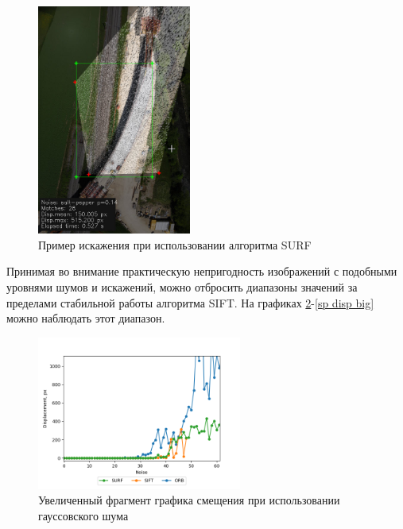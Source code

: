 {{{	\begin{figure}[H]
		\centering                             
		\includegraphics[width=0.45\textwidth,keepaspectratio]{fails/result.jpg}      
		\centering\caption{Пример искажения при использовании алгоритма SURF}
		\label{fail surf}    
	\end{figure} 

	Принимая во внимание практическую непригодность изображений с подобными уровнями шумов и искажений, можно отбросить диапазоны значений за пределами стабильной работы алгоритма SIFT. На графиках \ref{gauss disp big}-\ref{sp disp big} можно наблюдать этот диапазон. 
	
	\begin{figure}[H]
		\centering                             
		\includegraphics[width=0.60\textwidth,keepaspectratio]{ex2/gauss/Rand_noises_displacement_big.png}   
		\centering\caption{ Увеличенный фрагмент графика смещения при использовании гауссовского шума }
		\label{gauss disp big}                           
	\end{figure}    

}}}
